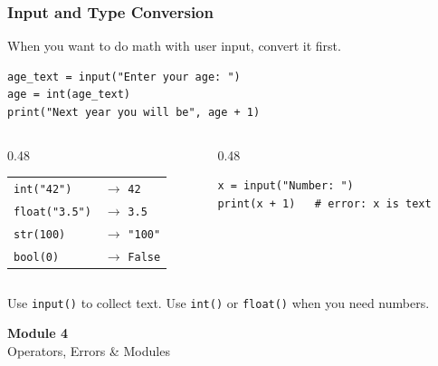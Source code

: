 \documentclass[aspectratio=169,10pt]{beamer}
\begin{document}
\begin{frame}[fragile]
\frametitle{Input and Type Conversion}
When you want to do math with user input, convert it first.

\begin{lstlisting}[style=pycode]
age_text = input("Enter your age: ")
age = int(age_text)
print("Next year you will be", age + 1)
\end{lstlisting}

\begin{columns}[T,totalwidth=\textwidth]
\begin{column}{0.48\textwidth}
\begin{tcolorbox}[lecturebox,title=Useful conversions]
\small
\begin{tabular}{@{}ll@{}}
\texttt{int("42")} & $\rightarrow$ \texttt{42} \\
\texttt{float("3.5")} & $\rightarrow$ \texttt{3.5} \\
\texttt{str(100)} & $\rightarrow$ \texttt{"100"} \\
\texttt{bool(0)} & $\rightarrow$ \texttt{False}
\end{tabular}
\end{tcolorbox}
\end{column}
\begin{column}{0.48\textwidth}
\begin{tcolorbox}[lecturebox,title=Common mistake]
\begin{lstlisting}[style=pycodesmall]
x = input("Number: ")
print(x + 1)   # error: x is text
\end{lstlisting}
\end{tcolorbox}
\end{column}
\end{columns}

\begin{tcolorbox}[lecturebox,title=Rule]
Use \texttt{input()} to collect text. Use \texttt{int()} or \texttt{float()} when you need numbers.
\end{tcolorbox}
\end{frame}



\begin{noheadline}
\begin{frame}
\vspace{1.35cm}
\begin{center}
  {\fontsize{30}{36}\selectfont\textbf{Module 4}}\\[0.35cm]
  {\fontsize{25}{30}\selectfont Operators, Errors \& Modules}\\[0.7cm]
\end{center}
\end{frame}
\end{noheadline}
\end{document}
